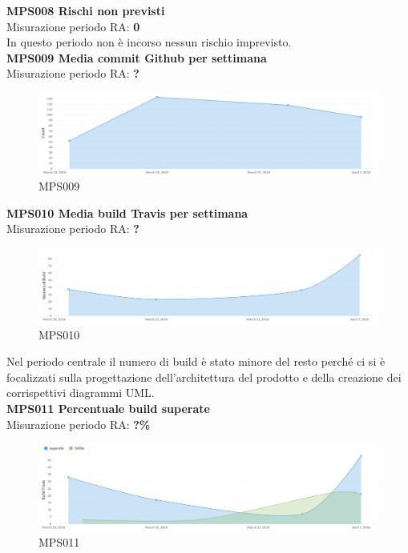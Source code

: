 \documentclass[PianoDiQualifica.tex]{subfiles}
\begin{document}
\textbf{MPS008 Rischi non previsti}\\
Misurazione periodo RA: \textbf{0}\\
In questo periodo non è incorso nessun rischio imprevisto.\\

\textbf{MPS009 Media commit Github per settimana}\\
Misurazione periodo RA: \textbf{?}
\begin{figure}[H]
	\centering
	\includegraphics[width=1\linewidth]{RQ/MPS009}
	\caption{MPS009}
	\label{fig:processi}
\end{figure}

\newpage
\textbf{MPS010 Media build Travis per settimana}\\
Misurazione periodo RA: \textbf{?}
\begin{figure}[H]
	\centering
	\includegraphics[width=1\linewidth]{RQ/MPS010}
	\caption{MPS010}
	\label{fig:processi}
\end{figure}
Nel periodo centrale il numero di build è stato minore del resto perché ci si è focalizzati sulla progettazione dell'architettura del prodotto e della creazione dei corrispettivi diagrammi UML.\\

\textbf{MPS011 Percentuale build superate}\\
Misurazione periodo RA: \textbf{?\%}
\begin{figure}[H]
	\centering
	\includegraphics[width=1\linewidth]{RQ/MPS011}
	\caption{MPS011}
	\label{fig:processi}
\end{figure}
\end{document}
